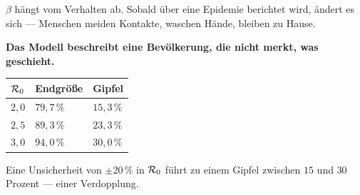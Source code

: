 \begin{warnung}
$\beta$ hängt vom Verhalten ab. Sobald über eine Epidemie berichtet wird, ändert es sich --- Menschen meiden Kontakte, waschen Hände, bleiben zu Hause.

\begin{center}
\begin{minipage}{0.9\textwidth}
\textbf{Das Modell beschreibt eine Bevölkerung, die nicht merkt, was geschieht.}
\end{minipage}
\end{center}

\begin{center}
\begin{minipage}{0.88\textwidth}
\end{minipage}
\end{center}
\end{warnung}

\begin{warnung}
\begin{center}
\renewcommand{\arraystretch}{1.48}
\begin{tabular}{@{}P{1.8cm}P{2.2cm}P{2.4cm}@{}}
\toprule
$\mathcal{R}_0$ & \textbf{Endgröße} & \textbf{Gipfel}\\
\midrule
$2{,}0$ & $79{,}7\,\%$ & $15{,}3\,\%$\\
$2{,}5$ & $89{,}3\,\%$ & $23{,}3\,\%$\\
$3{,}0$ & $94{,}0\,\%$ & $30{,}0\,\%$\\
\bottomrule
\end{tabular}
\end{center}

Eine Unsicherheit von $\pm 20\,\%$ in $\mathcal{R}_0$ führt zu einem Gipfel zwischen $15$ und $30$ Prozent --- einer Verdopplung.

\begin{center}
\begin{minipage}{0.88\textwidth}
\end{minipage}
\end{center}
\end{warnung}

